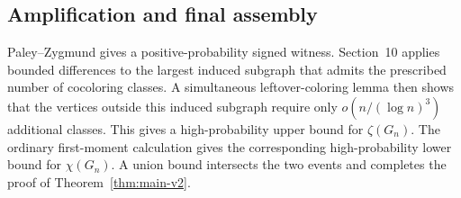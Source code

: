 \subsection{Amplification and final assembly}

Paley--Zygmund gives a positive-probability signed witness.  Section~10 applies
bounded differences to the largest induced subgraph that admits the prescribed
number of cocoloring classes.  A simultaneous leftover-coloring lemma then
shows that the vertices outside this induced subgraph require only
$o(n/(\log n)^3)$ additional classes.  This gives a high-probability upper
bound for $\zeta(G_n)$.  The ordinary first-moment calculation gives the
corresponding high-probability lower bound for $\chi(G_n)$.  A union bound
intersects the two events and completes the proof of Theorem~\ref{thm:main-v2}.

